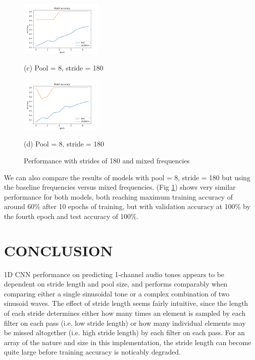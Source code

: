 \documentclass{article}
\begin{document}
\begin{figure}[htb]
\begin{minipage}[b]{0.48\linewidth}
  \centering
  \centerline{\includegraphics[width=4cm]{strides180_pool8}}
  \centerline{(c) Pool = 8, stride = 180}
\end{minipage}
%
\begin{minipage}[b]{0.48\linewidth}
  \centering
  \centerline{\includegraphics[width=4cm]{mixed}}
  \centerline{(d) Pool = 8, stride = 180}
\end{minipage}
%
\caption{Performance with strides of 180 and mixed frequencies}
\label{fig:res3_4}
%
\end{figure}

We can also compare the results of models with pool = 8, stride = 180 but using the baseline frequencies versus mixed frequencies. (Fig \ref{fig:res3_4}) shows very similar performance for both models, both reaching maximum training accuracy of around 60\% after 10 epochs of training, but with validation accuracy at 100\% by the fourth epoch and test accuracy of 100\%.

\hfill

\section{CONCLUSION}
\label{sec:CONC}

1D CNN performance on predicting 1-channel audio tones appears to be dependent on stride length and pool size, and performs comparably when comparing either a single sinusoidal tone or a complex combination of two sinusoid waves.  The effect of stride length seems fairly intuitive, since the length of each stride determines either how many times an element is sampled by each filter on each pass (i.e. low stride length) or how many individual elements may be missed altogether (i.e. high stride length) by each filter on each pass.  For an array of the nature and size in this implementation, the stride length can become quite large before training accuracy is noticably degraded.  
\end{document}
